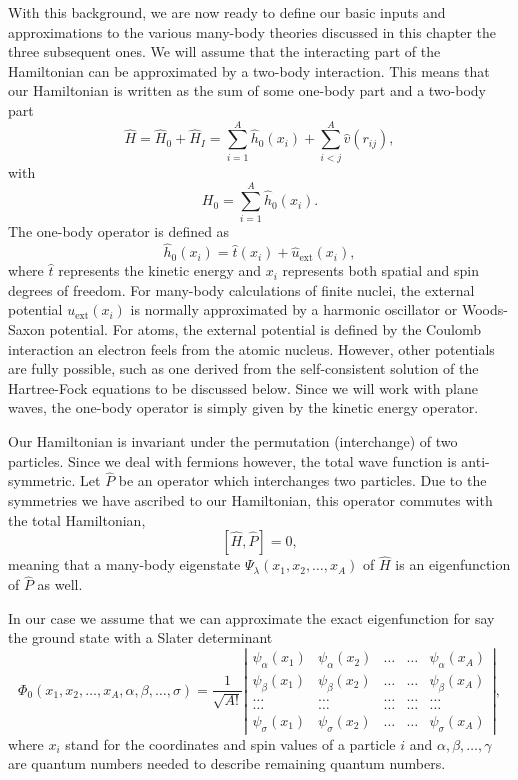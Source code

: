 With this background, we are now ready to define our basic inputs and approximations to the various many-body theories discussed in this chapter the three subsequent ones. 
We will assume that the interacting part of the Hamiltonian
can be approximated by a two-body interaction.
This means that our Hamiltonian is written as the sum of some one-body part and a two-body part
\begin{equation}
    \hat{H} = \hat{H}_0 + \hat{H}_I 
    = \sum_{i=1}^A \hat{h}_0(x_i) + \sum_{i < j}^A \hat{v}(r_{ij}),
\label{Hnuclei}
\end{equation}
with 
\begin{equation}
  H_0=\sum_{i=1}^A \hat{h}_0(x_i).
\label{hinuclei}
\end{equation}
The one-body operator is defined as
\[
\hat{h}_0(x_i)=\hat{t}(x_i) + \hat{u}_{\mathrm{ext}}(x_i),
\]
where $\hat{t}$ represents the kinetic energy and $x_i$ represents both spatial and spin degrees of freedom. 
For many-body calculations of finite nuclei,  
the external potential $u_{\mathrm{ext}}(x_i)$ is normally approximated by a harmonic oscillator or Woods-Saxon potential. For atoms, the external potential is defined by the Coulomb interaction an electron feels from the atomic nucleus. However, other potentials are fully possible, such as 
one derived from the self-consistent solution of the Hartree-Fock equations to be discussed below. Since we will work with plane waves, the one-body operator
is simply given by the kinetic energy operator. 

Our Hamiltonian is invariant under the permutation (interchange) of two particles.
Since we deal with fermions however, the total wave function is anti-symmetric.
Let $\hat{P}$ be an operator which interchanges two particles.
Due to the symmetries we have ascribed to our Hamiltonian, this operator commutes with the total Hamiltonian,
\[
[\hat{H},\hat{P}] = 0,
 \]
meaning that a many-body eigenstate $\Psi_{\lambda}(x_1, x_2, \dots , x_A)$ of $\hat{H}$ is an eigenfunction of 
$\hat{P}$ as well.

In our case we assume that  we can approximate the exact eigenfunction for say the ground state with a Slater determinant
\begin{equation}
   \Phi_0(x_1, x_2,\dots ,x_A,\alpha,\beta,\dots, \sigma)=\frac{1}{\sqrt{A!}}
\left| \begin{array}{ccccc} \psi_{\alpha}(x_1)& \psi_{\alpha}(x_2)& \dots & \dots & \psi_{\alpha}(x_A)\\
                            \psi_{\beta}(x_1)&\psi_{\beta}(x_2)& \dots & \dots & \psi_{\beta}(x_A)\\  
                            \dots & \dots & \dots & \dots & \dots \\
                            \dots & \dots & \dots & \dots & \dots \\
                     \psi_{\sigma}(x_1)&\psi_{\sigma}(x_2)& \dots & \dots & \psi_{\sigma}(x_A)\end{array} \right|, \label{eq:HartreeFockDet}
\end{equation}
where  $x_i$  stand for the coordinates and spin values of a particle $i$ and $\alpha,\beta,\dots, \gamma$ 
are quantum numbers needed to describe remaining quantum numbers.  

